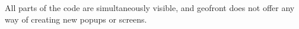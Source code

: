 All parts of the code are simultaneously visible, and geofront does not offer any way of creating new popups or screens.



















